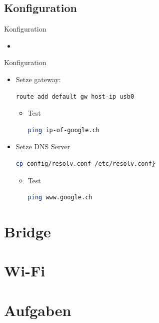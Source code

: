 \documentclass{beamer}
\begin{document}
\subsection{Konfiguration}
\begin{frame}[fragile]{Konfiguration}{\host}
  \begin{itemize}
  \item {}
  \end{itemize}
\end{frame}

\begin{frame}[fragile]{Konfiguration}{\target}
  \begin{itemize}
  \item Setze gateway:
  \begin{lstlisting}[language=bash]
route add default gw host-ip usb0
  \end{lstlisting}
  \begin{itemize}
  \item Test 
  \begin{lstlisting}[language=bash]
ping ip-of-google.ch  
  \end{lstlisting}
  \end{itemize}
  \item Setze DNS Server
  \begin{lstlisting}[language=bash]
cp config/resolv.conf /etc/resolv.conf}

  \end{lstlisting}
  \begin{itemize}
   \item Test 
   \begin{lstlisting}[language=bash]
ping www.google.ch 
   \end{lstlisting}
  \end{itemize}
  \end{itemize}
\end{frame}

\section{Bridge}


\section{Wi-Fi}


\section{Aufgaben}
\end{document}
